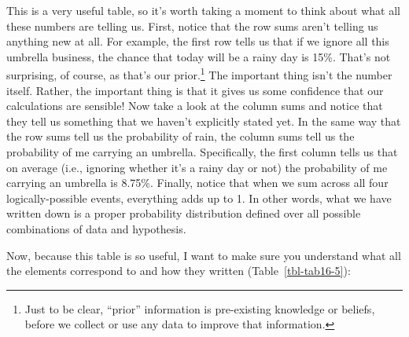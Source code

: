 \documentclass[
  a4paper,
]{book}
\begin{document}
This is a very useful table, so it's worth taking a moment to think
about what all these numbers are telling us. First, notice that the row
sums aren't telling us anything new at all. For example, the first row
tells us that if we ignore all this umbrella business, the chance that
today will be a rainy day is 15\%. That's not surprising, of course, as
that's our prior.\footnote{Just to be clear, ``prior'' information is
  pre-existing knowledge or beliefs, before we collect or use any data
  to improve that information.} The important thing isn't the number
itself. Rather, the important thing is that it gives us some confidence
that our calculations are sensible! Now take a look at the column sums
and notice that they tell us something that we haven't explicitly stated
yet. In the same way that the row sums tell us the probability of rain,
the column sums tell us the probability of me carrying an umbrella.
Specifically, the first column tells us that on average (i.e., ignoring
whether it's a rainy day or not) the probability of me carrying an
umbrella is 8.75\%. Finally, notice that when we sum across all four
logically-possible events, everything adds up to 1. In other words, what
we have written down is a proper probability distribution defined over
all possible combinations of data and hypothesis.

Now, because this table is so useful, I want to make sure you understand
what all the elements correspond to and how they written
(Table~\ref{tbl-tab16-5}):

\hypertarget{tbl-tab16-5}{}
 
  \providecommand{\huxb}[2]{\arrayrulecolor[RGB]{#1}\global\arrayrulewidth=#2pt}
  \providecommand{\huxvb}[2]{\color[RGB]{#1}\vrule width #2pt}
  \providecommand{\huxtpad}[1]{\rule{0pt}{#1}}
  \providecommand{\huxbpad}[1]{\rule[-#1]{0pt}{#1}}
\end{document}
